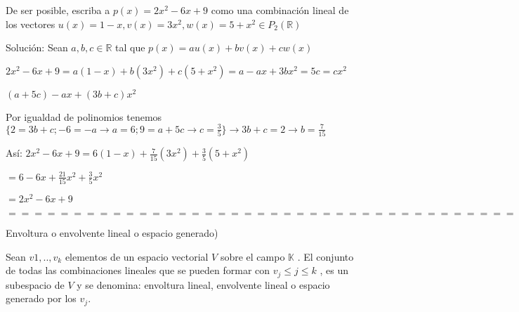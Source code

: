\begin{ejem}

De ser posible, escriba a $p(x)=2x^2-6x+9$  como una combinaci\'{o}n lineal de los vectores $u(x)= 1-x, v(x)=3x^2, w(x)=5+x^2\in P_2(\mathbb{R})$

Soluci\'{o}n: Sean  $a,b,c\in\mathbb{R}$ tal que $p(x)=au(x)+bv(x)+cw(x)$

$2x^2-6x+9=a(1-x)+b(3x^2)+c(5+x^2) = a-ax+3bx^2=5c=cx^2$

$(a+5c)-ax+(3b+c)x^2$

Por igualdad de polinomios tenemos $\{2=3b+c; -6=-a \to a=6; 9 = a+5c\to c=\frac{3}{5}\}\to 3b+c=2 \to b=\frac{7}{15}$

As\'{i}: $2x^2-6x+9=6(1-x)+\frac{7}{15}(3x^2)+\frac{3}{5}(5+x^2)$

$=6-6x+\frac{21}{15}x^2+\frac{3}{5}x^2$

$=2x^2-6x+9$

\end{ejem}

$==================================================================$
\begin{teo}

Envoltura o envolvente lineal o espacio generado)

Sean $v1,..,v_k$  elementos de un espacio vectorial $V$ sobre el campo $\mathbb{K}$ . El conjunto de todas las combinaciones lineales que se pueden formar con $v_j \leq j \leq k$ , es un subespacio de $V$ y se denomina: envoltura lineal, envolvente lineal o espacio generado por los $v_j$.
\end{teo}


